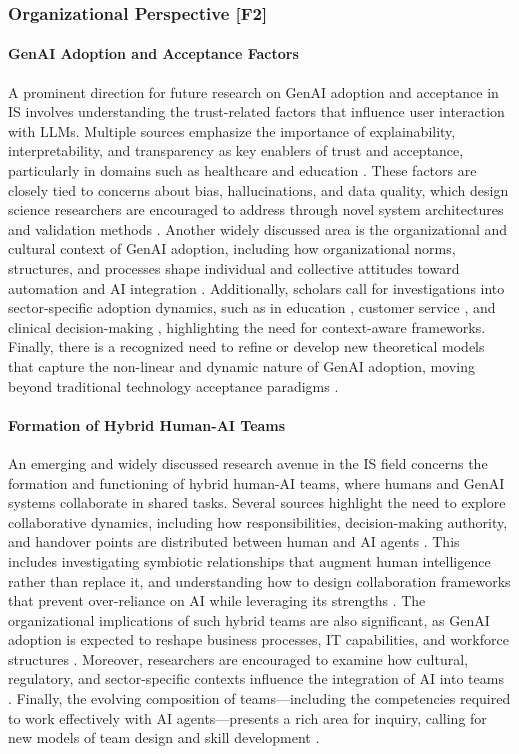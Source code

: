 \subsubsection{Organizational Perspective [F2]}

\paragraph{GenAI Adoption and Acceptance Factors}
A prominent direction for future research on GenAI adoption and acceptance in IS involves understanding the trust-related factors that influence user interaction with LLMs. Multiple sources emphasize the importance of explainability, interpretability, and transparency as key enablers of trust and acceptance, particularly in  domains such as healthcare and education \parencite{R02, R09, S01, S07}. These factors are closely tied to concerns about bias, hallucinations, and data quality, which design science researchers are encouraged to address through novel system architectures and validation methods \parencite{R02, S07}. Another widely discussed area is the organizational and cultural context of GenAI adoption, including how organizational norms, structures, and processes shape individual and collective attitudes toward automation and AI integration \parencite{R05, R07, R10}. Additionally, scholars call for investigations into sector-specific adoption dynamics, such as in education \parencite{R07, S12}, customer service \parencite{R08}, and clinical decision-making \parencite{R09}, highlighting the need for context-aware frameworks. Finally, there is a recognized need to refine or develop new theoretical models that capture the non-linear and dynamic nature of GenAI adoption, moving beyond traditional technology acceptance paradigms \parencite{S13}.

\paragraph{Formation of Hybrid Human-AI Teams}
An emerging and widely discussed research avenue in the IS field concerns the formation and functioning of hybrid human-AI teams, where humans and GenAI systems collaborate in shared tasks. Several sources highlight the need to explore collaborative dynamics, including how responsibilities, decision-making authority, and handover points are distributed between human and AI agents \parencite{R05, R07, S06}. This includes investigating symbiotic relationships that augment human intelligence rather than replace it, and understanding how to design collaboration frameworks that prevent over-reliance on AI while leveraging its strengths \parencite{R07, S12}. The organizational implications of such hybrid teams are also significant, as GenAI adoption is expected to reshape business processes, IT capabilities, and workforce structures \parencite{R03, R10}. Moreover, researchers are encouraged to examine how cultural, regulatory, and sector-specific contexts influence the integration of AI into teams \parencite{R03}. Finally, the evolving composition of teams—including the competencies required to work effectively with AI agents—presents a rich area for inquiry, calling for new models of team design and skill development \parencite{S06}.

